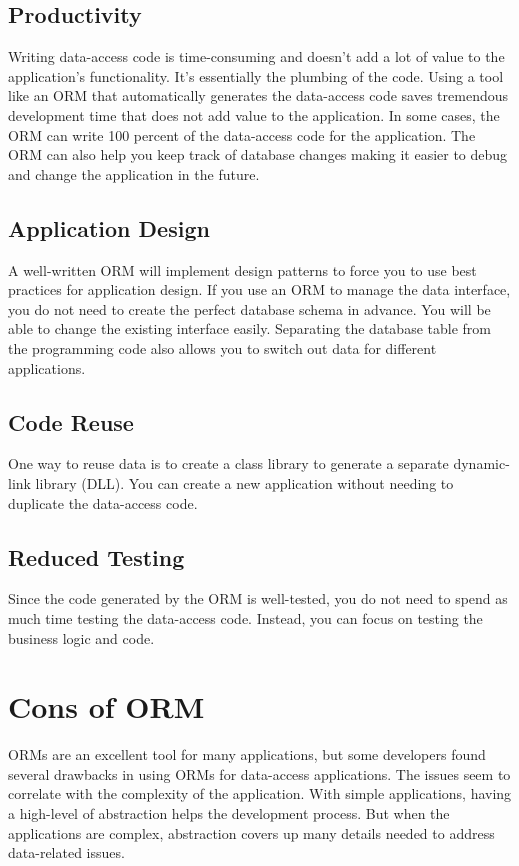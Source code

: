 \documentclass[10pt,a4paper,twoside]{article}
\begin{document}
\subsection{Productivity}
\item Writing data-access code is time-consuming and doesn’t add a lot of value to the application’s functionality. It’s essentially the plumbing of the code. Using a tool like an ORM that automatically generates the data-access code saves tremendous development time that does not add value to the application. In some cases, the ORM can write 100 percent of the data-access code for the application. The ORM can also help you keep track of database changes making it easier to debug and change the application in the future.
\subsection{Application Design}
\item A well-written ORM will implement design patterns to force you to use best practices for application design. If you use an ORM to manage the data interface, you do not need to create the perfect database schema in advance. You will be able to change the existing interface easily. Separating the database table from the programming code also allows you to switch out data for different applications.
\subsection{Code Reuse}
\item One way to reuse data is to create a class library to generate a separate dynamic-link library (DLL). You can create a new application without needing to duplicate the data-access code.
\subsection{Reduced Testing}
\item Since the code generated by the ORM is well-tested, you do not need to spend as much time testing the data-access code. Instead, you can focus on testing the business logic and code.


\section{Cons of ORM}
\item ORMs are an excellent tool for many applications, but some developers found several drawbacks in using ORMs for data-access applications. The issues seem to correlate with the complexity of the application. With simple applications, having a high-level of abstraction helps the development process. But when the applications are complex, abstraction covers up many details needed to address data-related issues.
\end{document}
